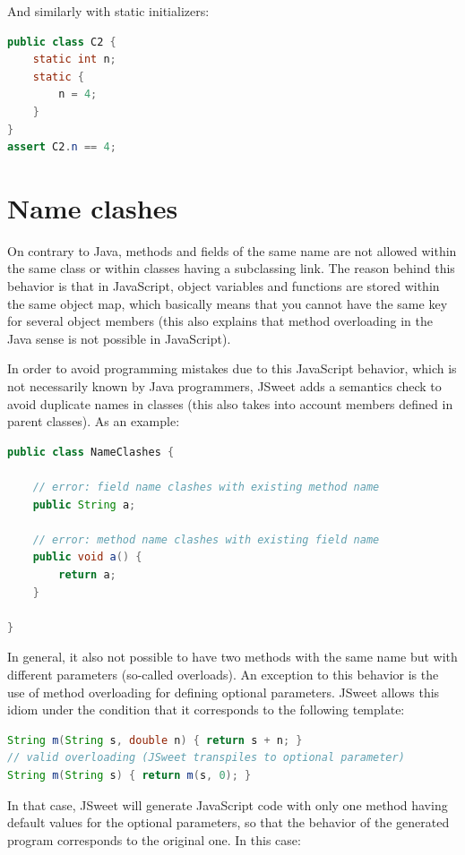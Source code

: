 \documentclass[a4paper]{report}
\begin{document}
\noindent
And similarly with static initializers:

\begin{lstlisting}[language=Java]
public class C2 {
	static int n;
	static {
		n = 4;
	}
}
assert C2.n == 4;
\end{lstlisting}


\section{Name clashes}

On contrary to Java, methods and fields of the same name are not allowed within the same class or within classes having a subclassing link. The reason behind this behavior is that in JavaScript, object variables and functions are stored within the same object map, which basically means that you cannot have the same key for several object members (this also explains that method overloading in the Java sense is not possible in JavaScript).

In order to avoid programming mistakes due to this JavaScript behavior, which is not necessarily known by Java programmers, JSweet adds a semantics check to avoid duplicate names in classes (this also takes into account members defined in parent classes). As an example:

\begin{lstlisting}[language=Java]
public class NameClashes {

	// error: field name clashes with existing method name
	public String a;

	// error: method name clashes with existing field name
	public void a() {
		return a;
	}

}
\end{lstlisting}

In general, it also not possible to have two methods with the same name but with different parameters (so-called overloads). An exception to this behavior is the use of method overloading for defining optional parameters. JSweet allows this idiom under the condition that it corresponds to the following template:

\begin{lstlisting}[language=Java]
String m(String s, double n) { return s + n; }
// valid overloading (JSweet transpiles to optional parameter)
String m(String s) { return m(s, 0); }
\end{lstlisting}

In that case, JSweet will generate JavaScript code with only one method having default values for the optional parameters, so that the behavior of the generated program corresponds to the original one. In this case:
\end{document}
